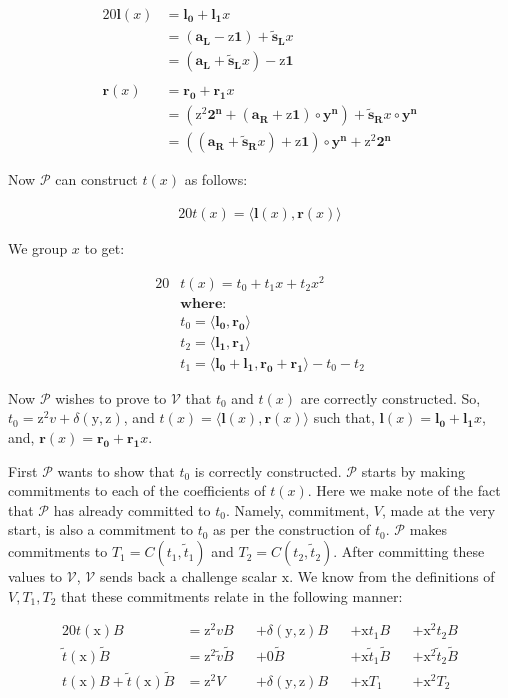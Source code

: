 \documentclass{article}
\newcommand{\eq}[1]{\begin{alignat*}{20}#1\end{alignat*}}
\renewcommand{\vec}[1]{\boldsymbol{#1}}
\newcommand{\ran}[1]{\mathrm{#1}}
\newcommand{\vecran}[1]{\mathbf{#1}}
\newcommand{\V}{\mathcal{V}}
\renewcommand{\P}{\mathcal{P}}
\newcommand{\dotp}[2]{\langle #1, #2 \rangle}
\newcommand{\opn}[1]{\operatorname{#1}}
\newcommand{\vecl}[1]{\vec{#1_{\opn{L}}}}
\newcommand{\vecr}[1]{\vec{#1_{\opn{R}}}}
\newcommand{\blind}[1]{\widetilde{#1}}
\newcommand{\bt}{\blind{t}}
\newcommand{\bv}{\blind{v}}
\newcommand{\bB}{\blind{B}}
\newcommand{\bs}{\blind{s}}
\begin{document}
\eq{
	\vec{l}(x) &= \vec{l_0} + \vec{l_1}x \\ 
	&= (\vecl{a} - \ran{z}\vec{1}) + \vecl{\bs}x \\ 
	&= (\vecl{a} + \vecl{\bs}x) - \ran{z}\vec{1}\\&\\
	\vec{r}(x) &= \vec{r_0} + \vec{r_1}x \\ 
	&= (\ran{z^2}\vec{2^n} + (\vecr{a} + \ran{z}\vec{1})\circ\vecran{y}^{\vec{n}}) + \vecr{\bs}x\circ\vecran{y}^{\vec{n}} \\ 
	&= ((\vecr{a} + \vecr{\bs}x) + \ran{z}\vec{1}) \circ \vecran{y}^{\vec{n}} + \ran{z}^2\vec{2^n}
}

Now $\P$ can construct $t(x)$ as follows:

\eq{
	t(x) = \dotp{\vec{l}(x)}{\vec{r}(x)}
}

We group $x$ to get:

\eq{
	&t(x) = t_0 + t_1x + t_2x^2 \\
	&\textbf{where:} \\
	&t_0 = \dotp{\vec{l_0}}{\vec{r_0}}\\
	&t_2 = \dotp{\vec{l_1}}{\vec{r_1}}\\
	&t_1 = \dotp{\vec{l_0}+\vec{l_1}}{\vec{r_0} + \vec{r_1}} - t_0 - t_2
}

Now $\P$ wishes to prove to $\V$ that $t_0$ and $t(x)$ are correctly
constructed. So, $t_0 = \ran{z^2}v + \delta(\ran{y},\ran{z})$, and $t(x)
= \dotp{\vec{l}(x)}{\vec{r}(x)}$ such that, $\vec{l}(x) = \vec{l_0}
+ \vec{l_1}x$, and, $\vec{r}(x) = \vec{r_0} + \vec{r_1}x$.

First $\P$ wants to show that $t_0$ is correctly constructed. $\P$
starts by making commitments to each of the coefficients of $t(x)$. Here
we make note of the fact that $\P$ has already committed to $t_0$. Namely,
commitment, $V$, made at the very start, is also a commitment to $t_0$
as per the construction of $t_0$. $\P$ makes commitments to $T_1 =
C(t_1, \bt_1)$ and $T_2 = C(t_2, \bt_2)$. After committing these values
to $\V$, $\V$ sends back a challenge scalar $\ran{x}$. We know from
the definitions of $V, T_1, T_2$ that these commitments relate in the
following manner:

\eq{
	t(\ran{x})B                   &= \ran{z^2}vB      &&+ \delta(\ran{y},\ran{z})B &&+ \ran{x}t_1B       &&+ \ran{x^2}t_2B \\
	\bt(\ran{x})\bB               &= \ran{z^2}\bv \bB &&+ 0\bB                     &&+ \ran{x} \bt_1 \bB &&+ \ran{x^2} \bt_2 \bB\\
	t(\ran{x})B + \bt(\ran{x})\bB &= \ran{z^2}V       &&+ \delta(\ran{y},\ran{z})B &&+ \ran{x}T_1        &&+ \ran{x^2}T_2
}
\end{document}
